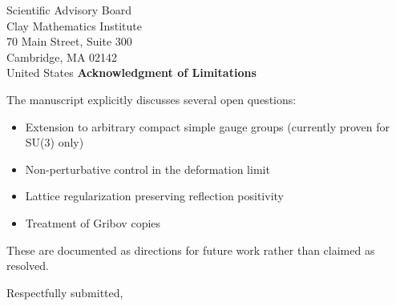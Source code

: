 \documentclass[11pt,a4paper]{letter}
\begin{document}
\begin{letter}{%
Scientific Advisory Board\\
Clay Mathematics Institute\\
70 Main Street, Suite 300\\
Cambridge, MA 02142\\
United States}
\medskip
\textbf{Acknowledgment of Limitations}

\medskip
The manuscript explicitly discusses several open questions:
\begin{itemize}
\item Extension to arbitrary compact simple gauge groups 
      (currently proven for SU(3) only)
\item Non-perturbative control in the deformation limit
\item Lattice regularization preserving reflection positivity
\item Treatment of Gribov copies
\end{itemize}

These are documented as directions for future work rather than 
claimed as resolved.

\closing{Respectfully submitted,}

\end{letter}
\end{document}

